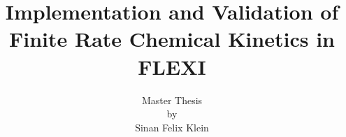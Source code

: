 \documentclass[a4paper,headsepline,bibtotoc]{scrreprt}
\begin{document}
\sloppy


\newcommand{\file}[1]{\mdseries\textsl{\textsf{#1}}}
\newcommand{\sbr}[1]{\texttt{#1}}
\newcommand{\var}[1]{\mdseries\textsl{\texttt{#1}}}
\newcommand{\cmd}[1]{\uppercase{\texttt{#1}}}

\title{Implementation and Validation of Finite Rate Chemical Kinetics in FLEXI}

\author{Master Thesis \\
        by \\
        Sinan Felix Klein}

\publishers{conducted at the \\
            Institute of Aerodynamics and Gas Dynamics \\
            University of Stuttgart.
            \\[5ex]
            Stuttgart, April 2025}

\date{}



\maketitle

\newpage
\thispagestyle{empty} 
\section*{}
\newpage

\pagestyle{plain}


\newpage
\thispagestyle{empty} 
\section*{}
\newpage



\newpage
\thispagestyle{empty} 
\section*{}
\newpage



\newpage
\thispagestyle{empty} 
\end{document}
